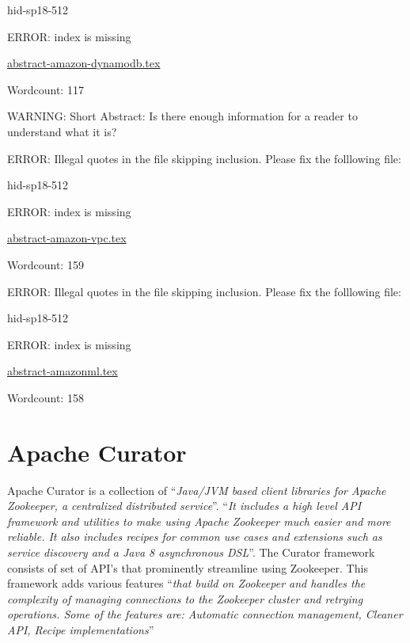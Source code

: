 \begin{IU}

hid-sp18-512

ERROR: index is missing

\href{https://github.com/cloudmesh-community/hid-sp18-512/blob/master//technology/abstract-amazon-dynamodb.tex}{abstract-amazon-dynamodb.tex}

 

Wordcount: 117

WARNING: Short Abstract: Is there enough information for a reader to understand what it is?

\end{IU}

ERROR: Illegal quotes in the file skipping inclusion. Please fix the folllowing file:

\begin{IU}

hid-sp18-512

ERROR: index is missing

\href{https://github.com/cloudmesh-community/hid-sp18-512/blob/master//technology/abstract-amazon-vpc.tex}{abstract-amazon-vpc.tex}

 

Wordcount: 159

\end{IU}

ERROR: Illegal quotes in the file skipping inclusion. Please fix the folllowing file:

\begin{IU}

hid-sp18-512

ERROR: index is missing

\href{https://github.com/cloudmesh-community/hid-sp18-512/blob/master//technology/abstract-amazonml.tex}{abstract-amazonml.tex}

 

Wordcount: 158

\end{IU}

\section{Apache Curator}

Apache Curator is a collection of \color{blue}``\emph{Java/JVM based client libraries for
Apache Zookeeper, a centralized distributed
service}''\color{black}\cite{hid-sp18-514-apachecurator}.  \color{blue}``\emph{It includes a high level
API framework and utilities to make using Apache Zookeeper much easier
and more reliable.  It also includes recipes for common use cases and
extensions such as service discovery and a Java 8 asynchronous
DSL}''\color{black}\cite{hid-sp18-514-apachecurator}.  The Curator framework consists
of set of API’s that prominently streamline using Zookeeper.  This
framework adds various features \color{blue}``\emph{that build on Zookeeper and handles
the complexity of managing connections to the Zookeeper cluster and
retrying operations.  Some of the features are: Automatic connection
management, Cleaner API, Recipe
implementations}''\color{black}\cite{hid-sp18-514-apachecuratorfeatures}


